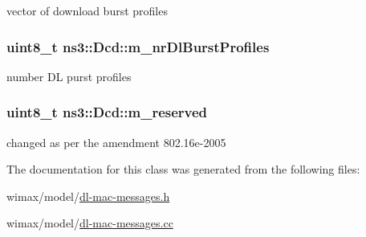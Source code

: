 vector of download burst profiles 

\subsubsection[{\texorpdfstring{m\+\_\+nr\+Dl\+Burst\+Profiles}{m_nrDlBurstProfiles}}]{\setlength{\rightskip}{0pt plus 5cm}uint8\+\_\+t ns3\+::\+Dcd\+::m\+\_\+nr\+Dl\+Burst\+Profiles\hspace{0.3cm}{\ttfamily [private]}}\hypertarget{classns3_1_1Dcd_a142e47440278d6e122d2796ede295f8a}{}\label{classns3_1_1Dcd_a142e47440278d6e122d2796ede295f8a}


number DL purst profiles 

\subsubsection[{\texorpdfstring{m\+\_\+reserved}{m_reserved}}]{\setlength{\rightskip}{0pt plus 5cm}uint8\+\_\+t ns3\+::\+Dcd\+::m\+\_\+reserved\hspace{0.3cm}{\ttfamily [private]}}\hypertarget{classns3_1_1Dcd_a279c0ff281741589ea0fd453b1c872b3}{}\label{classns3_1_1Dcd_a279c0ff281741589ea0fd453b1c872b3}


changed as per the amendment 802.\+16e-\/2005 



The documentation for this class was generated from the following files\+:\begin{DoxyCompactItemize}
\item 
wimax/model/\hyperlink{dl-mac-messages_8h}{dl-\/mac-\/messages.\+h}\item 
wimax/model/\hyperlink{dl-mac-messages_8cc}{dl-\/mac-\/messages.\+cc}\end{DoxyCompactItemize}
